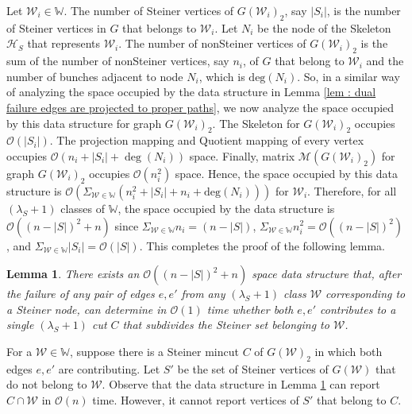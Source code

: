 \documentclass[letterpaper,11pt]{article}
\newtheorem{lemma}{Lemma}[]
\begin{document}
Let ${\mathcal W}_i\in {\mathbb W}$. The number of Steiner vertices of $G({\mathcal W}_i)_2$, say $|S_i|$, is the number of Steiner vertices in $G$ that belongs to ${\mathcal W}_i$. Let $N_i$ be the node of the Skeleton ${\mathcal H}_S$ that represents ${\mathcal W}_i$. The number of nonSteiner vertices of $G({\mathcal W}_i)_2$ is the sum of the number of nonSteiner vertices, say $n_i$, of $G$ that belong to ${\mathcal W}_i$ and the number of bunches adjacent to node $N_i$, which is $\text{deg}(N_i)$. So, in a similar way of analyzing the space occupied by the data structure in Lemma \ref{lem : dual failure edges are projected to proper paths}, we now analyze the space occupied by this data structure for graph $G({\mathcal W}_i)_2$. The Skeleton for $G({\mathcal W}_i)_2$ occupies ${\mathcal O}(|S_i|)$. The projection mapping and Quotient mapping of every vertex occupies ${\mathcal O}(n_i+|S_i|+\deg (N_i))$ space. Finally, matrix ${\mathcal M}({G({\mathcal W}_i)_2})$ for graph $G({\mathcal W}_i)_2$ occupies ${\mathcal O}(n_i^2)$ space. Hence, the space occupied by this data structure is ${\mathcal O}(\Sigma_{{\mathcal W}\in {\mathbb W}}(n_i^2+|S_i|+n_i+\text{deg}(N_i)))$ for ${\mathcal W}_i$. Therefore, for all $(\lambda_S+1)$ classes of ${\mathbb W}$, the space occupied by the data structure is ${\mathcal O}((n-|S|)^2+n)$ since $\Sigma_{{\mathcal W}\in {\mathbb W}}n_i=(n-|S|)$, $\Sigma_{{\mathcal W}\in {\mathbb W}}n_i^2={\mathcal O}((n-|S|)^2)$, and $\Sigma_{{\mathcal W}\in {\mathbb W}}|S_i|={\mathcal O}(|S|)$. This completes the proof of the following lemma.
\begin{lemma} \label{lem : dual failure and subdivide steiner set}
     There exists an ${\mathcal O}((n-|S|)^2+n)$ space data structure that, after the failure of any pair of edges $e,e'$ from any $(\lambda_S+1)$ class ${\mathcal W}$ corresponding to a Steiner node, can determine in ${\mathcal O}(1)$ time whether both $e,e'$ contributes to a single $(\lambda_S+1)$ cut $C$ that subdivides the Steiner set belonging to ${\mathcal W}$.
\end{lemma}
For a ${\mathcal W}\in {\mathbb W}$, suppose there is a Steiner mincut $C$ of $G({\mathcal W})_2$ in which both edges $e,e'$ are contributing. Let $S'$ be the set of Steiner vertices of $G({\mathcal W})$ that do not belong to ${\mathcal W}$. Observe that the data structure in Lemma \ref{lem : dual failure and subdivide steiner set} can report $C\cap {\mathcal W}$ in ${\mathcal O}(n)$ time. However, it cannot report vertices of $S'$ that belong to $C$. 
\end{document}
